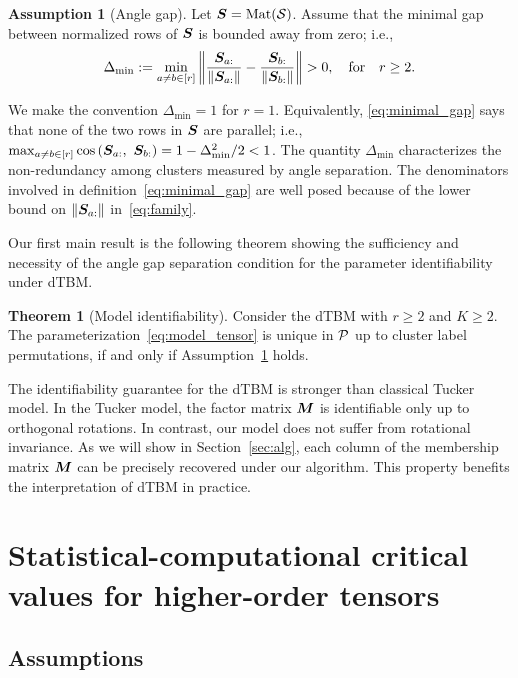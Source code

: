 \documentclass[journal]{IEEEtran}
\theoremstyle{definition}
\newtheorem{thm}{Theorem}
\theoremstyle{definition}
\newtheorem{assumption}{Assumption}
\newcommand{\of}[1]{\left(#1\right)}
\begin{document}
\begin{assumption}[Angle gap] \label{assmp:min_gap}Let $\bm S = \text{Mat}(\mathcal{S})$. Assume that the minimal gap between normalized rows of $\bm S$ is bounded away from zero; i.e.,
\begin{equation}\label{eq:minimal_gap}
    \Delta_{\min} := \min_{a \neq b \in [r]} \onorm{\frac{\mS_{a:}}{\onormSize{}{ \mS_{a:}}} - \frac{\mS_{b:}}{\onormSize{}{ \mS_{b:}}} }>0, \quad \text{for} \quad r \geq 2.
\end{equation}
\end{assumption}
We make the convention $\Delta_{\min} = 1$ for $r = 1$. Equivalently, \eqref{eq:minimal_gap} says that none of the two rows in $\bm S$ are parallel; i.e., $\max_{a \neq b\in [r]}\cos \of{\mS_{a:},\  \mS_{b:}}  = 1-\Delta^2_{\min}/2<1$. The quantity $\Delta_{\min}$ characterizes the non-redundancy among clusters measured by angle separation. The denominators involved in definition~\eqref{eq:minimal_gap} are well posed because of the lower bound on $\left\lVert\bm S_{a:}\right\rVert$ in~\eqref{eq:family}. 

Our first main result is the following theorem showing the sufficiency and necessity of the angle gap separation condition for the parameter identifiability under dTBM. 

\begin{thm}[Model identifiability]\label{thm:unique} Consider the dTBM with $r\geq 2$ {and $K \geq 2$}. The parameterization~\eqref{eq:model_tensor} is unique in $\mathcal{P}$ up to cluster label permutations, if and only if Assumption~\ref{assmp:min_gap} holds.
\end{thm}

The identifiability guarantee for the dTBM is stronger than classical Tucker model. In the Tucker model, the factor matrix $\bm M$ is identifiable only up to orthogonal rotations. In contrast, our model does not suffer from rotational invariance. As we will show in Section~\ref{sec:alg}, each column of the membership matrix $\bm M$ can be precisely recovered under our algorithm. This property benefits the interpretation of dTBM in practice. 


\section{Statistical-computational critical values for higher-order tensors}\label{sec:limits}


\subsection{Assumptions} \label{sec:prelim}
\end{document}
